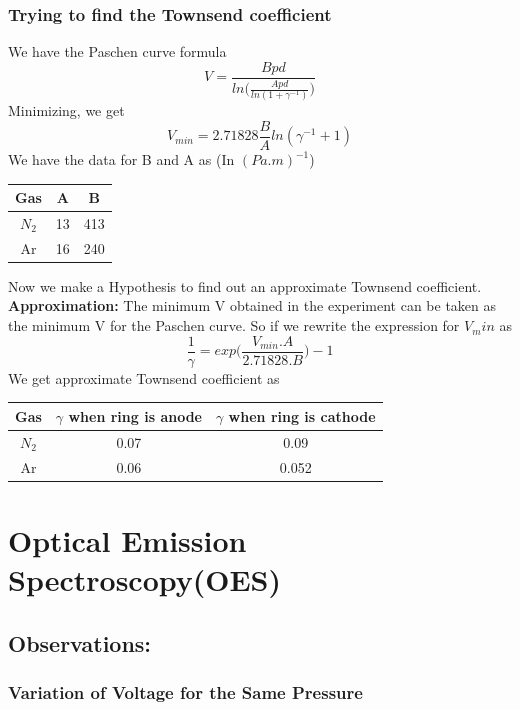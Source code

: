 \documentclass[]{report}[12 pt]
\begin{document}
\subsection{Trying to find the Townsend coefficient}
We have the Paschen curve formula
\[V = \frac{Bpd}{ln\bigg(\frac{Apd}{ln(1+\gamma^{-1})}\bigg)}\]
Minimizing, we get
\[V_{min}=2.71828\frac{B}{A}ln(\gamma^{-1}+1)\]
We have the data for B and A as (In $(Pa .m)^{-1}$)\\
\begin{center}
	\begin{tabular}{|c|c|c|}
		\hline
		Gas & A & B \\
		\hline
		$N_2$ & 13 & 413 \\
		\hline
		Ar & 16 & 240 \\
		\hline
	\end{tabular}
\end{center}
Now we make a Hypothesis to find out an approximate Townsend coefficient.\\
\textbf{Approximation:} The minimum V obtained in the experiment can be taken as the minimum V for the Paschen curve.
So if we rewrite the expression for $V_min$ as
\[\frac{1}{\gamma}=exp\bigg(\frac{V_{min}.A}{2.71828.B} \bigg)-1\]
We get approximate Townsend coefficient as
\begin{center}
	\begin{tabular}{|c|c|c|}
		\hline
		Gas & $\gamma$ when ring is anode & $\gamma$ when ring is cathode \\
		\hline
		$N_2$ & 0.07  & 0.09  \\
		\hline
		Ar & 0.06 & 0.052 \\
		\hline
	\end{tabular}
\end{center}

\chapter{Optical Emission Spectroscopy(OES)}
\section{Observations:}
\subsection{Variation of Voltage for the Same Pressure}
\end{document}
